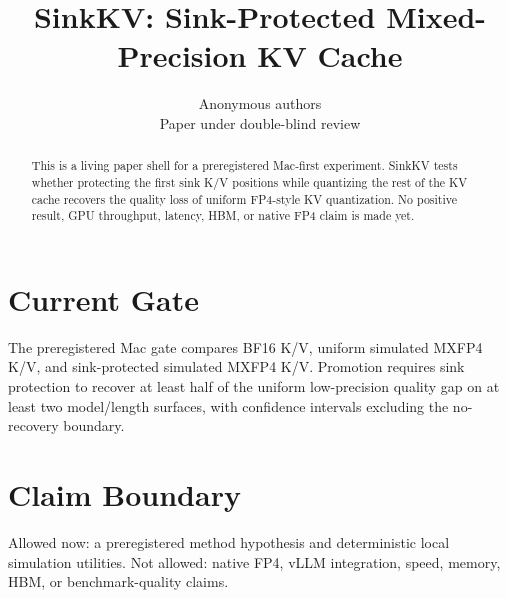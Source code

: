 \documentclass{article}
\title{SinkKV: Sink-Protected Mixed-Precision KV Cache}
\author{Anonymous authors\\Paper under double-blind review}
\begin{document}
\maketitle

\begin{abstract}
This is a living paper shell for a preregistered Mac-first experiment. SinkKV
tests whether protecting the first sink K/V positions while quantizing the rest
of the KV cache recovers the quality loss of uniform FP4-style KV quantization.
No positive result, GPU throughput, latency, HBM, or native FP4 claim is made
yet.
\end{abstract}

\section{Current Gate}

The preregistered Mac gate compares BF16 K/V, uniform simulated MXFP4 K/V, and
sink-protected simulated MXFP4 K/V. Promotion requires sink protection to recover
at least half of the uniform low-precision quality gap on at least two
model/length surfaces, with confidence intervals excluding the no-recovery
boundary.

\section{Claim Boundary}

Allowed now: a preregistered method hypothesis and deterministic local
simulation utilities. Not allowed: native FP4, vLLM integration, speed, memory,
HBM, or benchmark-quality claims.
\end{document}
